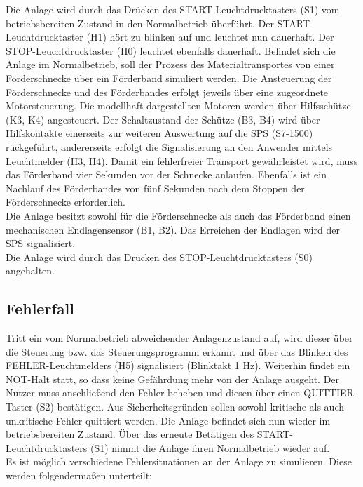 Die Anlage wird durch das Drücken des START-Leuchtdrucktasters (S1) vom betriebsbereiten Zustand in den Normalbetrieb überführt. Der START-Leuchtdrucktaster (H1) hört zu blinken auf und leuchtet nun dauerhaft. Der STOP-Leuchtdrucktaster (H0) leuchtet ebenfalls dauerhaft. Befindet sich die Anlage im Normalbetrieb, soll der Prozess des Materialtransportes von einer Förderschnecke über ein Förderband simuliert werden. Die Ansteuerung der Förderschnecke und des Förderbandes erfolgt jeweils über eine zugeordnete Motorsteuerung. Die modellhaft dargestellten Motoren werden über Hilfsschütze (K3, K4) angesteuert. Der Schaltzustand der Schütze (B3, B4) wird über Hilfskontakte einerseits zur weiteren Auswertung auf die SPS (S7-1500) rückgeführt, andererseits erfolgt die Signalisierung an den Anwender mittels Leuchtmelder (H3, H4). Damit ein fehlerfreier Transport gewährleistet wird, muss das Förderband vier Sekunden vor der Schnecke anlaufen. Ebenfalls ist ein Nachlauf des Förderbandes von fünf Sekunden nach dem Stoppen der Förderschnecke erforderlich. \\
Die Anlage besitzt sowohl für die Förderschnecke als auch das Förderband einen mechanischen Endlagensensor (B1, B2). Das Erreichen der Endlagen wird der SPS signalisiert. \\
Die Anlage wird durch das Drücken des STOP-Leuchtdrucktasters (S0) angehalten.

\subsection{Fehlerfall}

Tritt ein vom Normalbetrieb abweichender Anlagenzustand auf, wird dieser über die Steuerung bzw. das Steuerungsprogramm erkannt und über das Blinken des FEHLER-Leuchtmelders (H5) signalisiert (Blinktakt 1 Hz). Weiterhin findet ein NOT-Halt statt, so dass keine Gefährdung mehr von der Anlage ausgeht. Der Nutzer muss anschließend den Fehler beheben und diesen über einen QUITTIER-Taster (S2) bestätigen. Aus Sicherheitsgründen sollen sowohl kritische als auch unkritische Fehler quittiert werden. Die Anlage befindet sich nun wieder im betriebsbereiten Zustand. Über das erneute Betätigen des START-Leuchtdrucktasters (S1) nimmt die Anlage ihren Normalbetrieb wieder auf. \\
Es ist möglich verschiedene Fehlersituationen an der Anlage zu simulieren. Diese werden folgendermaßen unterteilt:

